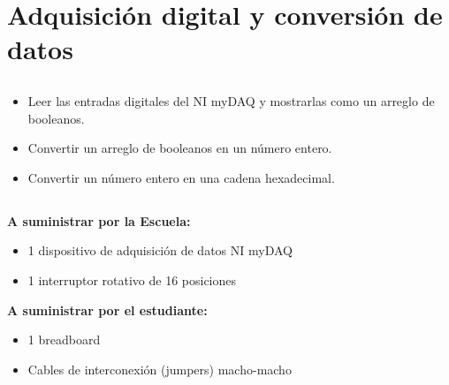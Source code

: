 \chapter{Adquisición digital y conversión de datos}
\section{\obj}
\capacidad
\begin{itemize}
\item Leer las entradas digitales del NI myDAQ y mostrarlas como un arreglo de booleanos.
\item Convertir un arreglo de booleanos en un número entero.
\item Convertir un número entero en una cadena hexadecimal.
\end{itemize}

\section{\mat}
\textbf{A suministrar por la Escuela:}
\begin{itemize}
\item 1 dispositivo de adquisición de datos NI myDAQ
\item 1 interruptor rotativo de 16 posiciones

\end{itemize}
\textbf{A suministrar por el estudiante:}
\begin{itemize}
\item 1 breadboard
\item Cables de interconexión (jumpers) macho-macho
\end{itemize}

